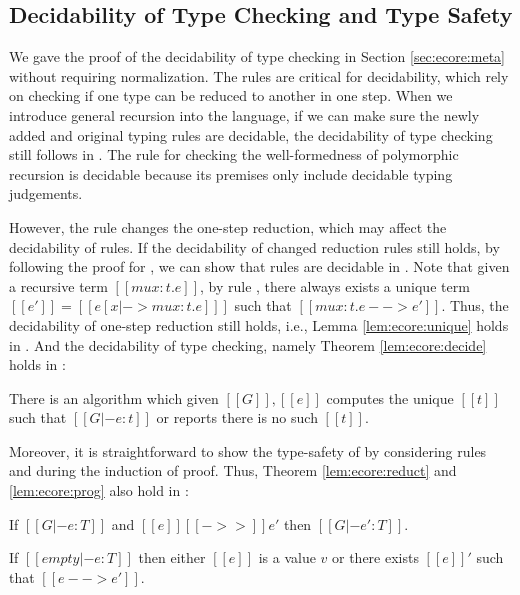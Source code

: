 \subsection{Decidability of Type Checking and Type Safety}\label{sec:rec:meta}
We gave the proof of the decidability of type checking \ecore in
Section \ref{sec:ecore:meta} without requiring normalization. The
\cast rules are critical for decidability, which rely on checking if
one type can be reduced to another in one step. When we introduce
general recursion into the language, if we can make sure the newly
added and original typing rules are decidable, the decidability
of type checking still follows in \name.
The rule  for checking the well-formedness of
polymorphic recursion is decidable because its premises only include
decidable typing judgements. 

However, the rule  changes
the one-step reduction, which may affect the decidability of \cast
rules. If the decidability of changed reduction rules still holds, by
following the proof for \ecore, we can show that \cast
rules are decidable in \name. Note that given a recursive term
$[[mu x:t.e]]$, by rule , there always exists a unique
term $[[e']]=[[e[x|->mu x:t.e] ]]$ such that $[[mu x:t.e -->
    e']]$. Thus, the decidability of one-step reduction still holds,
i.e., Lemma \ref{lem:ecore:unique} holds in \name. And the decidability
of type checking, namely Theorem \ref{lem:ecore:decide} holds in \name:

\begin{thm}\label{lem:rec:decide}
	There is an algorithm which given $[[G]], [[e]]$ computes the
        unique $[[t]]$ such that $[[G |- e:t]]$ or reports there is no
        such $[[t]]$.
\end{thm}

Moreover, it is straightforward to show the type-safety of \name by
considering rules  and  during the
induction of proof. Thus, Theorem \ref{lem:ecore:reduct} and
\ref{lem:ecore:prog} also hold in \name:

\begin{thm}\label{lem:rec:reduct}
If $[[G |- e:T]]$ and $[[e]] [[->>]] e'$ then $[[G |- e':T]]$.
\end{thm}

\begin{thm}\label{lem:rec:prog}
If $[[empty |- e:T]]$ then either $[[e]]$ is a value $v$ or there
exists $[[e]]'$ such that $[[e --> e']]$.
\end{thm}
